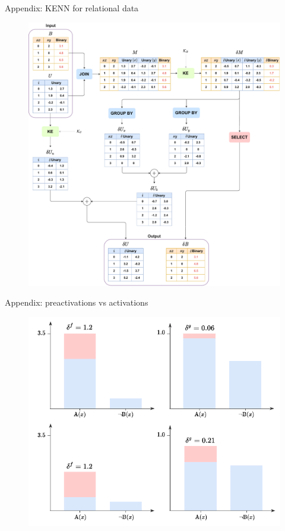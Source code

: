 \documentclass{beamer}
\newcommand{\backupend}{
	\addtocounter{framenumberappendix}{-\value{framenumber}}
	\addtocounter{framenumber}{\value{framenumberappendix}} 
}
\begin{document}
\begin{frame}{Appendix: KENN for relational data}
	\begin{figure}
		\includegraphics[width=0.65\linewidth]{images/kenn_relational_global_chart.pdf}
	\end{figure}
\end{frame}

\begin{frame}{Appendix: preactivations vs activations}
	\begin{figure}
		\includegraphics[width=0.75\linewidth]{images/preac_deltas_example.pdf}
	\end{figure}
\end{frame}


\backupend
\end{document}
